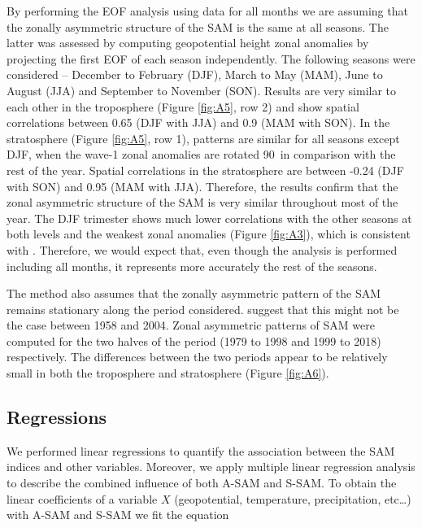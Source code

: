 \documentclass[smallextended]{svjour3}       %
\begin{document}
By performing the EOF analysis using data for all months we are assuming that the zonally asymmetric structure of the SAM is the same at all seasons.
The latter was assessed by computing geopotential height zonal anomalies by projecting the first EOF of each season independently.
The following seasons were considered -- December to February (DJF), March to May (MAM), June to August (JJA) and September to November (SON).
Results are very similar to each other in the troposphere (Figure \ref{fig:A5}, row 2) and show spatial correlations between 0.65 (DJF with JJA) and 0.9 (MAM with SON).
In the stratosphere (Figure \ref{fig:A5}, row 1), patterns are similar for all seasons except DJF, when the wave-1 zonal anomalies are rotated 90\degree~in comparison with the rest of the year.
Spatial correlations in the stratosphere are between -0.24 (DJF with SON) and 0.95 (MAM with JJA).
Therefore, the results confirm that the zonal asymmetric structure of the SAM is very similar throughout most of the year.
The DJF trimester shows much lower correlations with the other seasons at both levels and the weakest zonal anomalies (Figure \ref{fig:A3}), which is consistent with \citet{fogt2020}.
Therefore, we would expect that, even though the analysis is performed including all months, it represents more accurately the rest of the seasons.

The method also assumes that the zonally asymmetric pattern of the SAM remains stationary along the period considered.
\citet{silvestri2009} suggest that this might not be the case between 1958 and 2004.
Zonal asymmetric patterns of SAM were computed for the two halves of the period (1979 to 1998 and 1999 to 2018) respectively.
The differences between the two periods appear to be relatively small in both the troposphere and stratosphere (Figure \ref{fig:A6}).

\hypertarget{regressions}{%
\subsection{Regressions}\label{regressions}}

We performed linear regressions to quantify the association between the SAM indices and other variables.
Moreover, we apply multiple linear regression analysis to describe the combined influence of both A\nobreakdash-SAM and S\nobreakdash-SAM.
To obtain the linear coefficients of a variable \(X\) (geopotential, temperature, precipitation, etc\ldots) with A\nobreakdash-SAM and S\nobreakdash-SAM we fit the equation
\end{document}
